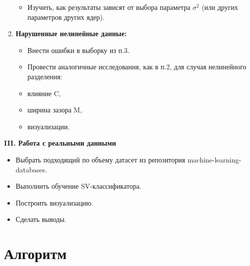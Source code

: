 \begin{enumerate}
\begin{itemize}
\item Изучить, как результаты зависят от выбора параметра $\sigma^2$ (или других параметров других ядер).
\end{itemize}
\item \textbf{Нарушенные нелинейные данные:}
\begin{itemize}
\item Внести ошибки в выборку из п.3.
\item Провести аналогичные исследования, как в п.2, для случая нелинейного
разделения:
\item влияние C,
\item ширина зазора M,
\item визуализации.
\end{itemize}
\end{enumerate}


\textbf{III. Работа с реальными данными}
\begin{itemize}
\item Выбрать подходящий по объему датасет из репозитория machine-learning-databases.
\item Выполнить обучение SV-классификатора.
\item Построить визуализацию.
\item Сделать выводы.
\end{itemize}
\section{Алгоритм}

